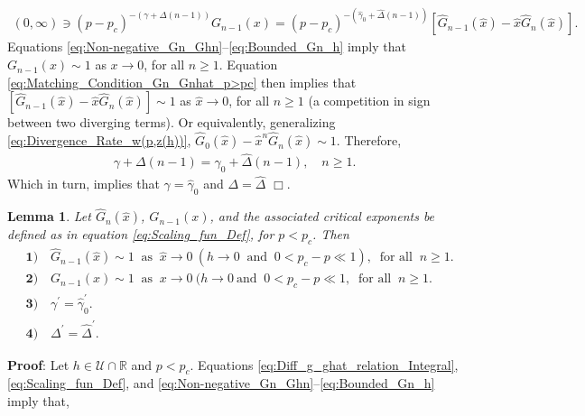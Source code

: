 \documentclass[english,12pt,jmp,graphicx]{revtex4-1}
\newtheorem{lemma}{Lemma}[section]
\newcommand{\ph}{\hat{\phi}}
\newcommand{\gh}{\hat{\gamma}}
\newcommand{\Dh}{\hat{\Delta}}
\newcommand{\xh}{\hat{x}}
\begin{document}
%
\begin{align}\label{eq:Matching_Condition_Gn_Gnhat_p>pc}
  (0,\infty)\ni(p-p_c)^{-(\gamma+\Delta(n-1))}G_{n-1}(x)
       =(p-p_c)^{-(\gh_0+\Dh(n-1))}[\hat{G}_{n-1}(\xh)-\xh\hat{G}_n(\xh)].
\end{align}
%
Equations \eqref{eq:Non-negative_Gn_Ghn}--\eqref{eq:Bounded_Gn_h}
imply that $G_{n-1}(x)\sim1$ as $x\to0$, for all $n\geq1$. Equation
\eqref{eq:Matching_Condition_Gn_Gnhat_p>pc} then implies that 
$[\hat{G}_{n-1}(\xh)-\xh\hat{G}_n(\xh)]\sim1$ as $\xh\to0$,
for all $n\geq1$ (a competition in sign between two diverging
terms). Or equivalently, generalizing
\eqref{eq:Divergence_Rate_w(p,z(h))},
$\hat{G}_0(\xh)-\xh^n\hat{G}_n(\xh)\sim1$. Therefore,   
%
\begin{align}
  \gamma+\Delta(n-1)=\gh_0+\Dh(n-1), \quad n\geq1.
\end{align}
%
Which in turn, implies that $\gamma=\gh_0$ and $\Delta=\Dh$ $\Box$.
%
%
 \begin{lemma}\label{lem:asymp_Scaling_funs_x_to_0_p<pc}
   Let $\hat{G}_n(\xh)$, $G_{n-1}(x)$, and the associated critical
   exponents be defined as in equation \eqref{eq:Scaling_fun_Def}, for
   $p<p_c$. Then
     \begin{align*}
    &\mathbf{1)}\quad \hat{G}_{n-1}(\xh)\sim1 \ \text{ as } \ \xh\to0 \ (h\to0
    \ \text{ and } \ 0<p_c-p\ll1), \ \text{ for all } \ n\geq1. \\
    &\mathbf{2)}\quad G_{n-1}(x)\sim1 \ \text{ as } \ x\to0 \ (h\to0 \ \text{
      and } \ 0<p_c-p\ll1, \ \text{ for all } \ n\geq1.\\
    &\mathbf{3)}\quad \gamma^\prime=\gh_0^\prime.  \\%
    &\mathbf{4)}\quad \Delta^\prime=\Dh^\prime.   
     \end{align*}
 \end{lemma}
%
\noindent \textbf{Proof}:
%
Let $h\in\mathcal{U}\cap\mathbb{R}$ and $p<p_c$.
Equations \eqref{eq:Diff_g_ghat_relation_Integral}, 
\eqref{eq:Scaling_fun_Def}, and
\eqref{eq:Non-negative_Gn_Ghn}--\eqref{eq:Bounded_Gn_h} imply that,
\end{document}
